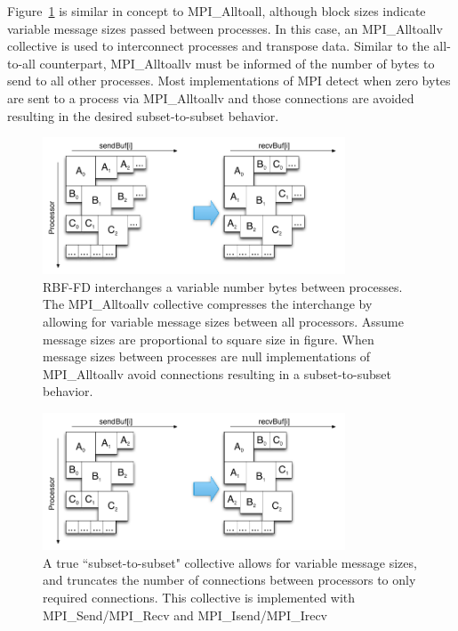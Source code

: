 \documentclass{report}
\begin{document}
Figure~\ref{fig:mpi_alltoallv_visual} is similar in concept to MPI\_Alltoall, although block sizes indicate variable message sizes passed between processes. In this case, an MPI\_Alltoallv collective is used to interconnect processes and transpose data. Similar to the all-to-all counterpart, MPI\_Alltoallv must be informed of the number of bytes to send to all other processes. 
Most implementations of MPI detect when zero bytes are sent to a process via MPI\_Alltoallv and those connections are avoided resulting in the desired subset-to-subset behavior.








\begin{figure}
\begin{center}
\includegraphics[width=9cm]{../figures/omnigraffle/MPI_Alltoallv_Visual.png}
\caption{RBF-FD interchanges a variable number bytes between processes. The MPI\_Alltoallv collective compresses the interchange by allowing for variable message sizes between all processors. Assume message sizes are proportional to square size in figure. When message sizes between processes are null implementations of MPI\_Alltoallv avoid connections resulting in a subset-to-subset behavior.}
\label{fig:mpi_alltoallv_visual}
\end{center}


\end{figure}
\begin{figure}
\begin{center}
\includegraphics[width=9cm]{../figures/omnigraffle/MPI_IsendIrecv_Visual.png}
\caption{A true ``subset-to-subset" collective allows for variable message sizes, and truncates the number of connections between processors to only required connections. This collective is implemented with MPI\_Send/MPI\_Recv and MPI\_Isend/MPI\_Irecv}
\label{fig:mpi_isendirecv_visual}
\end{center}
\end{figure}
\end{document}
